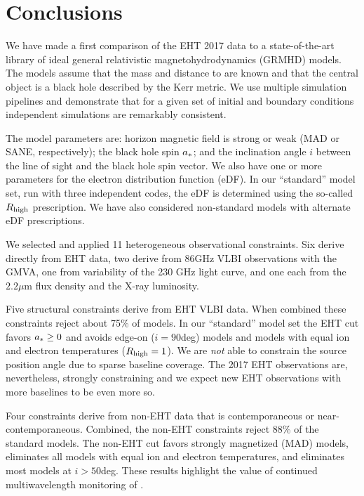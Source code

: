 \section{Conclusions}
\label{sec:conclusions}

We have made a first comparison of the EHT 2017 \sgra data to a state-of-the-art library of ideal general relativistic magnetohydrodynamics (GRMHD) models.  The models assume that the mass and distance to \sgra are known and that the central object is a black hole described by the Kerr metric. We use multiple simulation pipelines and demonstrate that for a given set of initial and boundary conditions independent simulations are remarkably consistent.  

The model parameters are: horizon magnetic field is strong or weak (MAD or SANE, respectively); the black hole spin $a_*$; and the inclination angle $i$ between the line of sight and the black hole spin vector.  We also have one or more parameters for the electron distribution function (eDF).  In our ``standard'' model set, run with three independent codes, the eDF is determined using the so-called $R_\mathrm{high}$ prescription.  We have also considered non-standard models with alternate eDF prescriptions.   

We selected and applied 11 heterogeneous observational constraints.  Six derive directly from EHT data, two derive from 86GHz VLBI observations with the GMVA, one from variability of the 230 GHz light curve, and one each from the $2.2\mu$m flux density and the X-ray luminosity.  

Five structural constraints derive from EHT VLBI data.  When combined these constraints reject about 75\% of models.  In our ``standard'' model set the EHT cut favors $a_* \ge 0$ and avoids edge-on ($i = 90$deg) models and models with equal ion and electron temperatures ($R_\mathrm{high} = 1$).  We are {\em not} able to constrain the source position angle due to sparse baseline coverage.  The 2017 EHT observations are, nevertheless, strongly constraining and we expect new EHT observations with more baselines to be even more so.   

Four constraints derive from non-EHT data that is contemporaneous or near-contemporaneous.  Combined, the non-EHT constraints reject 88\% of the standard models.  The non-EHT cut favors strongly magnetized (MAD) models, eliminates all models with equal ion and electron temperatures, and eliminates most models at $i > 50$deg.  These results highlight the value of continued multiwavelength monitoring of \sgra.

